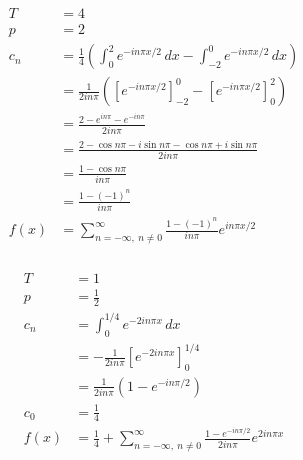 \documentclass{article}
\begin{document}
\begin{align*}
  T    & = 4                                                                                                   \\
  p    & = 2                                                                                                   \\
  c_n  & = \frac{1}{4} \left( \int_0^2 e^{-i n \pi x / 2} \,d x - \int_{-2}^0 e^{-i n \pi x / 2} \,d x \right) \\
       & = \frac{1}{2 i n \pi} ([e^{-i n \pi x / 2}]_{-2}^0 - [e^{-i n \pi x / 2}]_0^2)                        \\
       & = \frac{2 - e^{i n \pi} - e^{-i n \pi}}{2 i n \pi}                                                    \\
       & = \frac{2 - \cos n \pi - i \sin n \pi - \cos n \pi + i \sin n \pi}{2 i n \pi}                         \\
       & = \frac{1 - \cos n \pi}{i n \pi}                                                                      \\
       & = \frac{1 - (-1)^n}{i n \pi}                                                                          \\
  f(x) & = \sum_{n = -\infty,\ n \ne 0}^\infty \frac{1 - (-1)^n}{i n \pi} e^{i n \pi x / 2}
\end{align*}

\setcounter{subsubsection}{2}
\subsubsection{}

\begin{align*}
  T    & = 1                                                                                                        \\
  p    & = \frac{1}{2}                                                                                              \\
  c_n  & = \int_0^{1 / 4} e^{-2 i n \pi x} \,d x                                                                    \\
       & = -\frac{1}{2 i n \pi} [e^{-2 i n \pi x}]_0^{1 / 4}                                                        \\
       & = \frac{1}{2 i n \pi} (1 - e^{-i n \pi / 2})                                                               \\
  c_0  & = \frac{1}{4}                                                                                              \\
  f(x) & = \frac{1}{4} + \sum_{n = -\infty,\ n \ne 0}^\infty \frac{1 - e^{-i n \pi / 2}}{2 i n \pi} e^{2 i n \pi x}
\end{align*}
\end{document}
